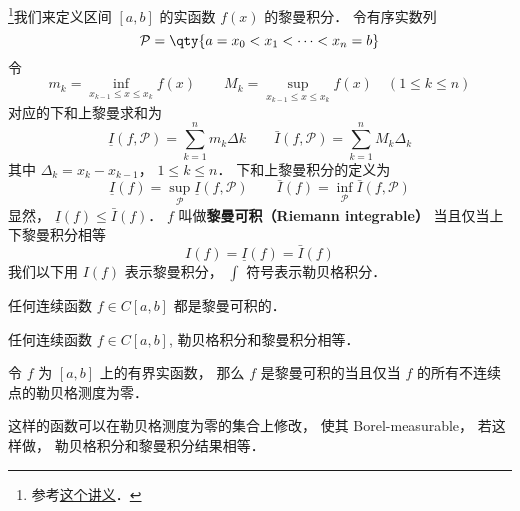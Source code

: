 
\footnote{参考\href{https://math.berkeley.edu/~arveson/Dvi/105/note1.pdf}{这个讲义}．}我们来定义区间 $[a, b]$ 的实函数 $f(x)$ 的黎曼积分． 令有序实数列
\begin{equation}
\mathcal P = \qty{a = x_0 < x_1 < \dots < x_n = b}
\end{equation}
令
\begin{equation}
m_k = \inf_{x_{k-1} \le x \le x_k} f(x) \qquad M_k = \sup_{x_{k-1} \le x \le x_k} f(x) \quad (1 \le k \le n)
\end{equation}
对应的下和上黎曼求和为
\begin{equation}
\underline I(f, \mathcal P) = \sum_{k = 1}^n m_k\Delta k \qquad \bar I(f, \mathcal P) = \sum_{k = 1}^n M_k \Delta_k
\end{equation}
其中 $\Delta_k = x_k - x_{k-1}$， $1\le k\le n$． 下和上黎曼积分的定义为
\begin{equation}
\underline I(f) = \sup_{\mathcal P} \underline I(f, \mathcal P) \qquad \bar I(f) = \inf_{\mathcal P} \bar I(f, \mathcal P)
\end{equation}
显然， $\underline I(f) \le \bar I(f)$． $f$ 叫做\textbf{黎曼可积（Riemann integrable）} 当且仅当上下黎曼积分相等
\begin{equation}
I(f) = \underline I(f) = \bar I(f)
\end{equation}
我们以下用 $I(f)$ 表示黎曼积分， $\int$ 符号表示勒贝格积分．

\begin{theorem}{}
任何连续函数 $f \in C[a, b]$ 都是黎曼可积的．
\end{theorem}

\begin{theorem}{}
任何连续函数 $f \in C[a, b]$, 勒贝格积分和黎曼积分相等．
\end{theorem}

\begin{theorem}{}
令 $f$ 为 $[a, b]$ 上的有界实函数， 那么 $f$ 是黎曼可积的当且仅当 $f$ 的所有不连续点的勒贝格测度为零．
\end{theorem}

这样的函数可以在勒贝格测度为零的集合上修改， 使其 Borel-measurable， 若这样做， 勒贝格积分和黎曼积分结果相等．
